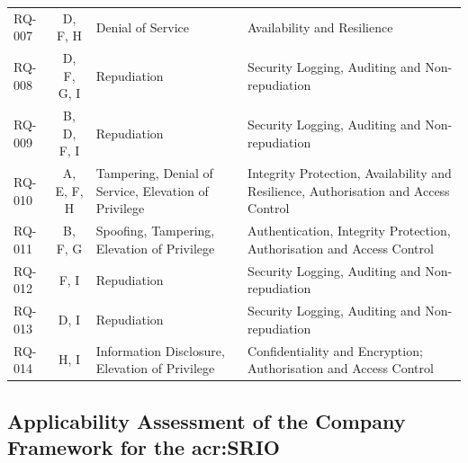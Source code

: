 {\begin{xltabular}{\textwidth}{@{}
			l
			c
			>{\raggedright\arraybackslash}p{4cm}
			>{\raggedright\arraybackslash}X
			@{}}
		RQ-007 & D, F, H & Denial of Service & Availability and Resilience \\
		
		RQ-008 & D, F, G, I & Repudiation & Security Logging, Auditing and Non-repudiation \\
		
		RQ-009 & B, D, F, I & Repudiation & Security Logging, Auditing and Non-repudiation \\
		
		RQ-010 & A, E, F, H & Tampering, \newline Denial of Service, \newline Elevation of Privilege & Integrity Protection, Availability and Resilience, Authorisation and Access Control \\
		
		RQ-011 & B, F, G & Spoofing, Tampering, Elevation of Privilege & Authentication, Integrity Protection, Authorisation and Access Control \\
		
		RQ-012 & F, I & Repudiation & Security Logging, Auditing and Non-repudiation \\
		
		RQ-013 & D, I & Repudiation & Security Logging, Auditing and Non-repudiation \\
		
		RQ-014 & H, I & Information Disclosure, Elevation of Privilege & Confidentiality and Encryption; Authorisation and Access Control \\
		
	\end{xltabular}
}




\subsection{Applicability Assessment of the Company Framework for the \gls{acr:SRIO}}
\label{subsec:cm_applicability}

